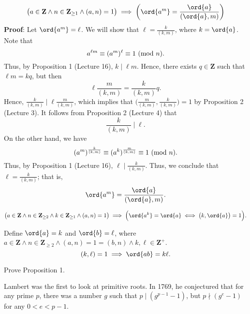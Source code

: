 \begin{Theorem}{}{}
    \[ \bigl(a\in\mathbf{Z}\land n\in\mathbf{Z}_{\ge 1}\land (a,n)=1\bigr)
        \implies \biggl(\ord{a^m}=\frac{\ord{a}}{(\ord{a},m)}\biggr) \]
    \tcblower{}
    \textbf{Proof}: Let $ \ord{a^m}=\ell $. We will show that $ \ell=\frac{k}{(k,m)} $,
    where $ k=\ord{a} $. Note that
    \[ a^{\ell m}\equiv (a^m)^\ell\equiv 1\ (\mathrm{mod}\ n). \]
    Thus, by Proposition 1 (Lecture 16), $ k\mid \ell m $. Hence, there exists $ q\in\mathbf{Z} $ such that $ \ell m=kq $, but then
    \[ \ell \frac{m}{(k,m)}=\frac{k}{(k,m)}q. \]
    Hence, $ \frac{k}{(k,m)}\mid \ell \frac{m}{(k,m)} $, which implies
    that $ \bigl(\frac{m}{(k,m)},\frac{k}{(k,m)}\bigr)=1 $ by Proposition 2 (Lecture 3). It follows from Proposition 2 (Lecture 4)
    that
    \[ \frac{k}{(k,m)}\mid \ell. \]
    On the other hand, we have
    \[ (a^m)^{\frac{k}{(k,m)}} \equiv (a^k)^{\frac{m}{(k,m)}}\equiv 1\ (\mathrm{mod}\ n). \]
    Thus, by Proposition 1 (Lecture 16), $ \ell\mid \frac{k}{(k,m)} $. Thus, we conclude that $ \ell=\frac{k}{(k,m)} $; that is,
    \[ \ord{a^m}=\frac{\ord{a}}{(\ord{a},m)}. \]
\end{Theorem}
\begin{Corollary}{}{}
    \[ \bigl(a\in\mathbf{Z}\land n\in\mathbf{Z}_{\ge 2}\land k\in\mathbf{Z}_{\ge 1}\land (a,n)=1\bigr)
        \implies \Bigl(\ord{a^k}=\ord{a}\iff \bigl(k,\ord{a}\bigr)=1\Bigr). \]
\end{Corollary}
\begin{Proposition}{}{}
    Define $ \ord{a}=k $ and $ \ord{b}=\ell $, where
    $ a\in\mathbf{Z}\land n\in\mathbf{Z}_{\ge 2}\land (a,n)=1=(b,n)\land k,\ell\in\mathbf{Z}^+ $.
    \[ (k,\ell)=1\implies \ord{ab}=k\ell. \]
\end{Proposition}
\begin{Exercise}{}{}
    Prove Proposition 1.
\end{Exercise}
Lambert was the first to look at primitive roots. In 1769, he conjectured that
for any prime $ p $, there was a number $ g $ such that $ p\mid (g^{p-1}-1) $,
but $ p\nmid (g^e-1) $ for any $ 0<e<p-1 $.


